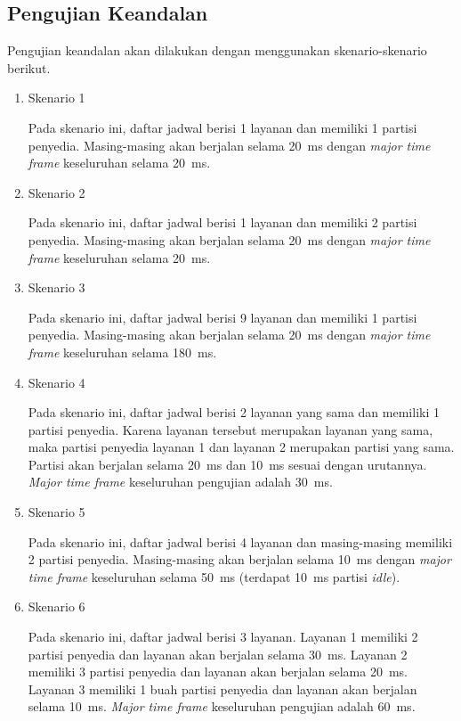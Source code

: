 \subsection{Pengujian Keandalan}

Pengujian keandalan akan dilakukan dengan menggunakan skenario-skenario berikut.

\begin{enumerate}
	\item Skenario 1

		Pada skenario ini, daftar jadwal berisi 1 layanan dan memiliki 1 partisi
		penyedia. Masing-masing akan berjalan selama \SI{20}{\milli\second} dengan
		\textit{major time frame} keseluruhan selama \SI{20}{\milli\second}.

	\item Skenario 2

		Pada skenario ini, daftar jadwal berisi 1 layanan dan memiliki 2 partisi
		penyedia. Masing-masing akan berjalan selama \SI{20}{\milli\second} dengan
		\textit{major time frame} keseluruhan selama \SI{20}{\milli\second}.

	\item Skenario 3

		Pada skenario ini, daftar jadwal berisi 9 layanan dan memiliki 1 partisi
		penyedia. Masing-masing akan berjalan selama \SI{20}{\milli\second} dengan
		\textit{major time frame} keseluruhan selama \SI{180}{\milli\second}.

	\item Skenario 4

		Pada skenario ini, daftar jadwal berisi 2 layanan yang sama dan memiliki 1
		partisi penyedia. Karena layanan tersebut merupakan layanan yang sama, maka
		partisi penyedia layanan 1 dan layanan 2 merupakan partisi yang sama.  Partisi
		akan berjalan selama \SI{20}{\milli\second} dan \SI{10}{\milli\second} sesuai
		dengan urutannya. \textit{Major time frame} keseluruhan pengujian adalah
		\SI{30}{\milli\second}.

	\item Skenario 5

		Pada skenario ini, daftar jadwal berisi 4 layanan dan masing-masing memiliki 2
		partisi penyedia. Masing-masing akan berjalan selama \SI{10}{\milli\second}
		dengan \textit{major time frame} keseluruhan selama \SI{50}{\milli\second}
		(terdapat \SI{10}{\milli\second} partisi \textit{idle}).

	\item Skenario 6

		Pada skenario ini, daftar jadwal berisi 3 layanan. Layanan 1 memiliki 2 partisi
		penyedia dan layanan akan berjalan selama \SI{30}{\milli\second}. Layanan 2
		memiliki 3 partisi penyedia dan layanan akan berjalan selama
		\SI{20}{\milli\second}. Layanan 3 memiliki 1 buah partisi penyedia dan layanan
		akan berjalan selama \SI{10}{\milli\second}. \textit{Major time frame}
		keseluruhan pengujian adalah \SI{60}{\milli\second}.

\end{enumerate}

